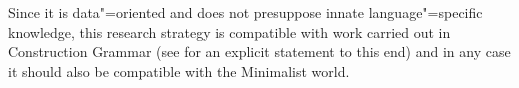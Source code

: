 Since it is data"=oriented and does not presuppose innate language"=specific knowledge, this research strategy is compatible with work carried out in Construction Grammar (see
\citealp[]{Goldberg2013b} for an explicit statement to this end) and in any case it should also be compatible with the Minimalist
world.
\label{last-page-before-LLMs}







